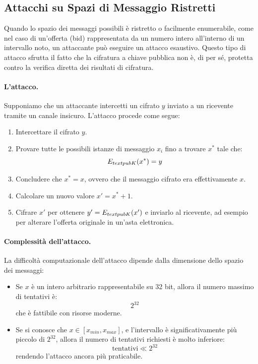 \documentclass{report}
\begin{document}
\subsection{Attacchi su Spazi di Messaggio Ristretti}

Quando lo spazio dei messaggi possibili è ristretto o facilmente enumerabile, come nel caso di un'offerta (bid) rappresentata da un numero intero all'interno di un intervallo noto, un attaccante può eseguire un attacco esaustivo. Questo tipo di attacco sfrutta il fatto che la cifratura a chiave pubblica non è, di per sé, protetta contro la verifica diretta dei risultati di cifratura.

\paragraph{L'attacco.} Supponiamo che un attaccante intercetti un cifrato $y$ inviato a un ricevente tramite un canale insicuro. L'attacco procede come segue:

\begin{enumerate}
  \item Intercettare il cifrato $y$.
  \item Provare tutte le possibili istanze di messaggio $x_i$ fino a trovare $x^*$ tale che:
  \begin{equation}
  E_{\\text{pubK}}(x^*) = y
  \end{equation}
  \item Concludere che $x^* = x$, ovvero che il messaggio cifrato era effettivamente $x$.
  \item Calcolare un nuovo valore $x' = x^* + 1$.
  \item Cifrare $x'$ per ottenere $y' = E_{\\text{pubK}}(x')$ e inviarlo al ricevente, ad esempio per alterare l'offerta originale in un'asta elettronica.
\end{enumerate}

\paragraph{Complessità dell'attacco.} La difficoltà computazionale dell'attacco dipende dalla dimensione dello spazio dei messaggi:

\begin{itemize}
  \item Se $x$ è un intero arbitrario rappresentabile su 32 bit, allora il numero massimo di tentativi è:
  \begin{equation}
  2^{32}
  \end{equation}
  che è fattibile con risorse moderne.
  
  \item Se si conosce che $x \in [x_{min}, x_{max}]$, e l'intervallo è significativamente più piccolo di $2^{32}$, allora il numero di tentativi richiesti è molto inferiore:
  \begin{equation}
  \text{tentativi} \ll 2^{32}
  \end{equation}
  rendendo l'attacco ancora più praticabile.
\end{itemize}
\end{document}
